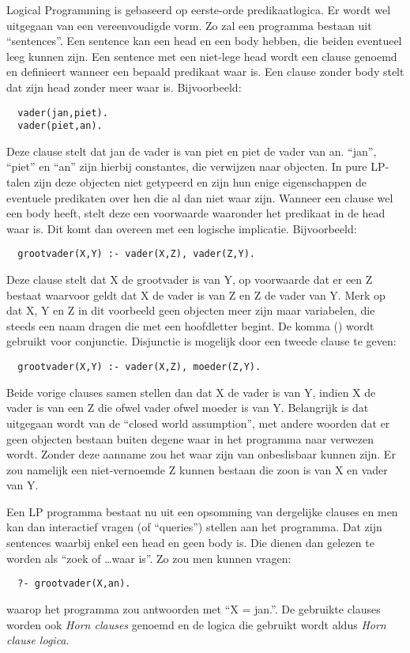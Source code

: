 Logical Programming is gebaseerd op eerste-orde predikaatlogica. Er wordt wel uitgegaan van een vereenvoudigde vorm. Zo zal een programma bestaan uit ``sentences''. Een sentence kan een head en een body hebben, die beiden eventueel leeg kunnen zijn. 
Een sentence met een niet-lege head wordt een clause genoemd en definieert wanneer een bepaald predikaat waar is. Een clause zonder body stelt dat zijn head zonder meer waar is. Bijvoorbeeld: \begin{Verbatim}
  vader(jan,piet).
  vader(piet,an).
\end{Verbatim}
Deze clause stelt dat jan de vader is van piet en piet de vader van an. ``jan'', ``piet'' en ``an'' zijn hierbij constantes, die verwijzen naar objecten. In pure LP-talen zijn deze objecten niet getypeerd en zijn hun enige eigenschappen de eventuele predikaten over hen die al dan niet waar zijn. Wanneer een clause wel een body heeft, stelt deze een voorwaarde waaronder het predikaat in de head waar is. Dit komt dan overeen met een logische implicatie. Bijvoorbeeld: \begin{Verbatim}
  grootvader(X,Y) :- vader(X,Z), vader(Z,Y).
\end{Verbatim}
Deze clause stelt dat X de grootvader is van Y, op voorwaarde dat er een Z bestaat waarvoor geldt dat X de vader is van Z en Z de vader van Y. Merk op dat X, Y en Z in dit voorbeeld geen objecten meer zijn maar variabelen, die steeds een naam dragen die met een hoofdletter begint. De komma (\code{,}) wordt gebruikt voor conjunctie. Disjunctie is mogelijk door een tweede clause te geven: \begin{Verbatim}
  grootvader(X,Y) :- vader(X,Z), moeder(Z,Y).
\end{Verbatim}
Beide vorige clauses samen stellen dan dat X de vader is van Y, indien X de vader is van een Z die ofwel vader ofwel moeder is van Y. Belangrijk is dat uitgegaan wordt van de ``closed world assumption'', met andere woorden dat er geen objecten bestaan buiten degene waar in het programma naar verwezen wordt. Zonder deze aanname zou het waar zijn van  onbeslisbaar kunnen zijn. Er zou namelijk een niet-vernoemde Z kunnen bestaan die zoon is van X en vader van Y.

Een LP programma bestaat nu uit een opsomming van dergelijke clauses en men kan dan interactief vragen (of ``queries'') stellen aan het programma. Dat zijn sentences waarbij enkel een head en geen body is. Die dienen dan gelezen te worden als ``zoek of \ldots waar is''. Zo zou men kunnen vragen: \begin{Verbatim}
  ?- grootvader(X,an).
\end{Verbatim}
waarop het programma zou antwoorden met ``X = jan.''. De gebruikte clauses worden ook {\em Horn clauses} genoemd en de logica die gebruikt wordt aldus {\em Horn clause logica}.

